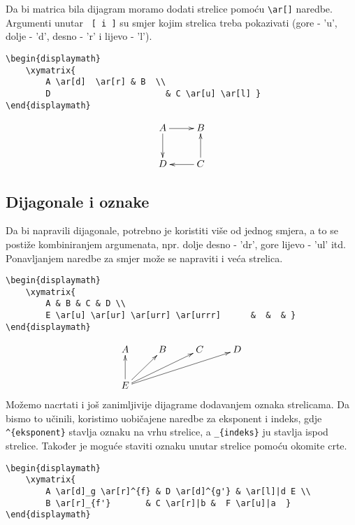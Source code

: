 \documentclass{beamer}
\begin{document}
 Da bi matrica bila dijagram moramo dodati strelice pomoću \verb|\ar[]| naredbe. Argumenti unutar \verb| [ i ]| su smjer kojim strelica treba pokazivati (gore - 'u', dolje - 'd', desno - 'r' i lijevo - 'l'). \\

\begin{verbatim}
\begin{displaymath}
    \xymatrix{
        A \ar[d]  \ar[r] & B  \\
        D                       & C \ar[u] \ar[l] }
\end{displaymath}
\end{verbatim}



\begin{displaymath}
    \xymatrix{
        A \ar[d] \ar[r] & B \\
        D    & C \ar[u] \ar[l] }
\end{displaymath}


\subsection{Dijagonale i oznake}
\justify
Da bi napravili dijagonale, potrebno je koristiti više od jednog smjera, a to se postiže kombiniranjem argumenata, npr. dolje desno - 'dr', gore lijevo - 'ul' itd. Ponavljanjem naredbe za smjer može se napraviti i veća strelica.


\begin{verbatim}
\begin{displaymath}
    \xymatrix{
        A & B & C & D \\
        E \ar[u] \ar[ur] \ar[urr] \ar[urrr]      &  &  & }
\end{displaymath}
\end{verbatim}

\begin{displaymath}
    \xymatrix{
        A & B & C & D \\
        E \ar[u] \ar[ur] \ar[urr] \ar[urrr]      &  &  & }
\end{displaymath}
\newpage
Možemo nacrtati i još zanimljivije dijagrame dodavanjem oznaka strelicama. Da bismo to učinili, koristimo uobičajene naredbe za eksponent i indeks, gdje \verb|^{eksponent}| stavlja oznaku na vrhu strelice, a \verb|_{indeks}| ju stavlja ispod strelice. Također je moguće staviti oznaku unutar strelice pomoću okomite crte.

\begin{verbatim}
\begin{displaymath}
    \xymatrix{
        A \ar[d]_g \ar[r]^{f} & D \ar[d]^{g'} & \ar[l]|d E \\
        B \ar[r]_{f'}       & C \ar[r]|b &  F \ar[u]|a  }
\end{displaymath}
\end{verbatim}
\end{document}
